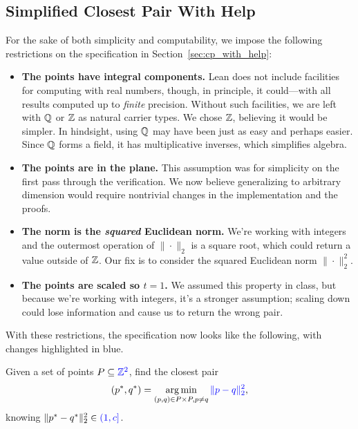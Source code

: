 \documentclass{article}
\begin{document}
\subsection{Simplified Closest Pair With Help}\label{sec:cp_with_help_simple}
For the sake of both simplicity and computability, we impose the following restrictions on the specification in Section~\ref{sec:cp_with_help}:
\begin{itemize}
  \item \textbf{The points have integral components.} Lean does not include facilities for computing with real numbers, though, in principle, it could---with all results computed up to \textit{finite} precision.
  Without such facilities, we are left with $\mathbb{Q}$ or $\mathbb{Z}$ as natural carrier types.
  We chose $\mathbb{Z}$, believing it would be simpler.
  In hindsight, using $\mathbb{Q}$ may have been just as easy and perhaps easier.
  Since $\mathbb{Q}$ forms a field, it has multiplicative inverses, which simplifies algebra.
  \item \textbf{The points are in the plane.} This assumption was for simplicity on the first pass through the verification.
  We now believe generalizing to arbitrary dimension would require nontrivial changes in the implementation and the proofs.
  \item \textbf{The norm is the \textit{squared} Euclidean norm.}
  We're working with integers and the outermost operation of $\| \cdot \|_2$ is a square root, which could return a value outside of $\mathbb{Z}$.
  Our fix is to consider the squared Euclidean norm $\| \cdot \|_2^2$.
  \item \textbf{The points are scaled so $t=1$.}
  We assumed this property in class, but because we're working with integers, it's a stronger assumption; scaling down could lose information and cause us to return the wrong pair.
\end{itemize}
With these restrictions, the specification now looks like the following, with changes highlighted in blue.
\begin{tcbproblem}{}{}
  Given a set of points $P \subseteq {\color{blue}\mathbb{Z}^2}$, find the closest pair
  \[ (p^*, q^*) = \operatorname*{arg\,min}_{(p,q) \in P\times P, p\neq q} {\color{blue}\|p - q\|_2^2}, \]
  knowing $\|p^* - q^*\|_2^2 \in {\color{blue}(1, c]}$.
\end{tcbproblem}

\end{document}
